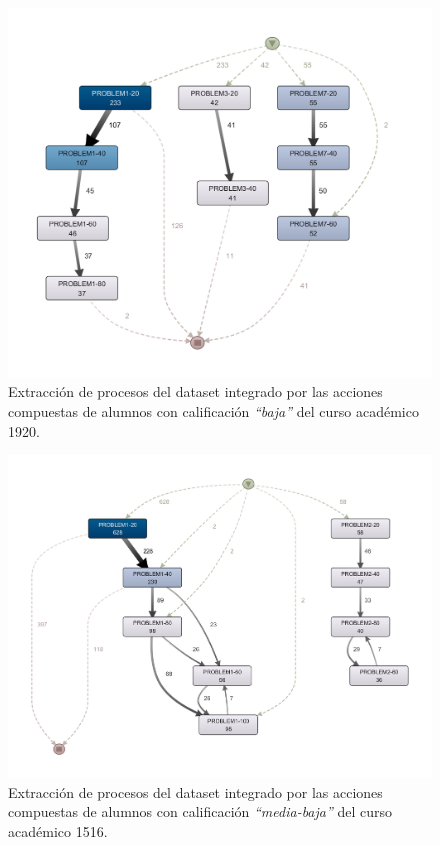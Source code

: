 \begin{figure}[H]
    \centering
    \includegraphics[width=1.25\textwidth]{imagenes/Year1920WorstGrades.png}
    \caption{Extracción de procesos del dataset integrado por las acciones compuestas de alumnos con calificación \emph{``baja''} del curso académico 1920.}
    \label{fig:year1920WorstGrades}
\end{figure}

\begin{figure}[H]
    \centering
    \includegraphics[width=1.25\textwidth]{imagenes/Year1516MidLowGrades.png}
    \caption{Extracción de procesos del dataset integrado por las acciones compuestas de alumnos con calificación \emph{``media-baja''} del curso académico 1516.}
    \label{fig:year1516MidLowGrades}
\end{figure}

